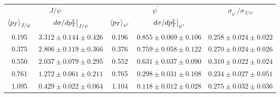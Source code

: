 \begin{tabular}{cc|cc|c}
\hline
\multicolumn{2}{c|}{$J/\psi$} &
  \multicolumn{2}{c|}{$\psi^{\prime}$} &
  \multirow{2}{*}{$\sigma_{\psi^\prime}/\sigma_{J/\psi}$} \\ \cline{1-4}
$\expval{p_T}_{J/\psi}$ &
  $\eval{d\sigma/dp^2_T}_{J/\psi}$ &
  $\expval{p_T}_{\psi^\prime}$ &
  $\eval{d\sigma/dp^2_T}_{\psi^\prime}$ &
   \\ \hline
0.195 & $3.312\pm0.144\pm0.426$ & 0.196 & $0.855\pm0.069\pm0.106$ & $0.258\pm0.024\pm0.022$ \\
0.375 & $2.806\pm0.119\pm0.366$ & 0.376 & $0.759\pm0.058\pm0.122$ & $0.270\pm0.024\pm0.026$ \\
0.550 & $2.037\pm0.079\pm0.295$ & 0.552 & $0.631\pm0.037\pm0.090$ & $0.310\pm0.022\pm0.024$ \\
0.761 & $1.272\pm0.061\pm0.211$ & 0.765 & $0.298\pm0.031\pm0.108$ & $0.234\pm0.027\pm0.051$ \\
1.095 & $0.429\pm0.022\pm0.064$ & 1.104 & $0.118\pm0.012\pm0.028$ & $0.275\pm0.032\pm0.036$ \\ \hline
\end{tabular}
